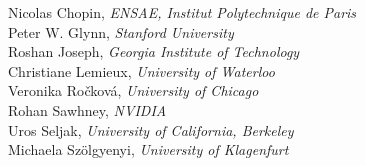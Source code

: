 Nicolas Chopin, \emph{ENSAE, Institut Polytechnique de Paris} \\[2em]
Peter W. Glynn, \emph{Stanford University} \\[2em]
Roshan Joseph, \emph{Georgia Institute of Technology} \\[2em]
Christiane Lemieux, \emph{University of Waterloo} \\[2em]
Veronika Ro\v{c}kov\'a, \emph{University of Chicago} \\[2em]
Rohan Sawhney, \emph{NVIDIA} \\[2em]
Uros Seljak, \emph{University of California, Berkeley} \\[2em]
Michaela Sz\"olgyenyi, \emph{University of Klagenfurt}
